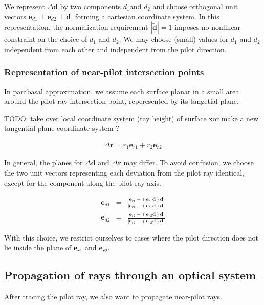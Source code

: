 \documentclass[12pt,a4paper,twoside,openright,BCOR10mm,headsepline,titlepage,abstracton,chapterprefix,final]{scrreprt}
\newcommand\Vector[1]{{\mathbf{#1}}}
\begin{document}
We represent $\Delta\Vector{d}$ by two components $d_1$and $d_2$ and choose orthogonal unit vectors $\Vector{e}_{d1} \perp \Vector{e}_{d2} \perp \Vector{d}$,
forming a cartesian coordinate system.
In this representation, the normalization requirement $|\tilde{\Vector{d}}| = 1$ imposes no nonlinear constraint on the choice of $d_1$ and $d_2$.
We may choose (small) values for $d_1$ and $d_2$ independent from each other and independent from the pilot direction. 

\subsubsection{Representation of near-pilot intersection points}

In parabasal approximation, we assume each surface planar in a small area around the pilot ray intersection point, 
reperesented by its tangetial plane.

TODO: take over local coordinate system (ray height) of surface xor make a new tangential plane coordinate system ?

\begin{eqnarray}
 \Delta\Vector{r} = r_1 \Vector{e}_{r1} + r_2 \Vector{e}_{r2}
\end{eqnarray}

In general, the planes for $\Delta\Vector{d}$ and $\Delta\Vector{r}$ may differ.
To avoid confusion, we choose the two unit vectors representing each deviation from the pilot ray identical,
except for the component along the pilot ray axis.

\begin{eqnarray}
 \Vector{e}_{d1} &=& \frac{\Vector{e}_{r1} - (\Vector{e}_{r1}\Vector{d})\Vector{d}}{|\Vector{e}_{r1} - (\Vector{e}_{r1}\Vector{d})\Vector{d}|}
 \\[2ex]
 \Vector{e}_{d2} &=& \frac{\Vector{e}_{r2} - (\Vector{e}_{r2}\Vector{d})\Vector{d}}{|\Vector{e}_{r2} - (\Vector{e}_{r2}\Vector{d})\Vector{d}|}
\end{eqnarray}

With this choice, we restrict ourselves to cases where the pilot direction does not lie inside the plane of $\Vector{e}_{r1}$ and $\Vector{e}_{r2}$.

\subsection{Propagation of rays through an optical system}

After tracing the pilot ray, we also want to propagate near-pilot rays.
\end{document}
